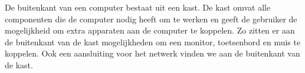 De buitenkant van een computer bestaat uit een kast. De kast omvat alle componenten die de computer nodig heeft om te werken en geeft de gebruiker de mogelijkheid om extra apparaten aan de computer te koppelen. Zo zitten er aan de buitenkant van de kast mogelijkheden om een monitor, toetsenbord en muis te koppelen. Ook een aansluiting voor het netwerk vinden we aan de buitenkant van de kast.

